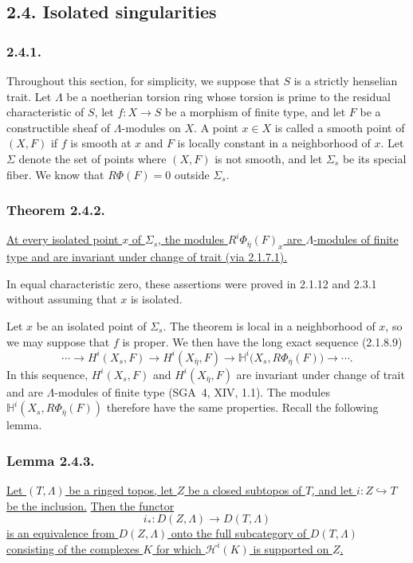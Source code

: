 \subsection*{2.4. Isolated singularities}

\subsubsection*{2.4.1.}
Throughout this section, for simplicity, we suppose that $S$ is a
strictly henselian trait.  Let $\Lambda$ be a noetherian torsion ring
whose torsion is prime to the residual characteristic of $S$, let
$f:X\longrightarrow S$ be a morphism of finite type, and let $F$ be a
constructible sheaf of $\Lambda$-modules on $X$.  A point $x\in X$ is
called a smooth point of $(X,F)$ if $f$ is smooth at $x$ and $F$ is
locally constant in a neighborhood of $x$.  Let $\Sigma$ denote the
set of points where $(X,F)$ is not smooth, and let $\Sigma_s$ be its
special fiber.  We know that $R\Phi(F)=0$ outside $\Sigma_s$.

\subsubsection*{Theorem 2.4.2.}
\underline{At every isolated point $x$ of $\Sigma_s$, the modules
$R^i\Phi_{\bar\eta}(F)_x$ are $\Lambda$-modules of finite type and
are invariant under change of trait (via 2.1.7.1).}

In equal characteristic zero, these assertions were proved in
2.1.12 and 2.3.1 without assuming that $x$ is isolated.

Let $x$ be an isolated point of $\Sigma_s$.  The theorem is local in
a neighborhood of $x$, so we may suppose that $f$ is proper.  We then
have the long exact sequence (2.1.8.9)
\[
\cdots\longrightarrow H^i(X_s,F)
\longrightarrow H^i(X_{\bar\eta},F)
\longrightarrow
\mathbb H^i\bigl(X_s,R\Phi_{\bar\eta}(F)\bigr)
\longrightarrow\cdots .
\]
In this sequence, $H^i(X_s,F)$ and $H^i(X_{\bar\eta},F)$ are
invariant under change of trait and are $\Lambda$-modules of finite
type (SGA~4, XIV, 1.1).  The modules
$\mathbb H^i(X_s,R\Phi_{\bar\eta}(F))$ therefore have the same
properties.  Recall the following lemma.

\subsubsection*{Lemma 2.4.3.}
\underline{Let $(T,\Lambda)$ be a ringed topos, let $Z$ be a closed
subtopos of $T$, and let $i:Z\hookrightarrow T$ be the inclusion.}
\underline{Then the functor}
\[
i_*:D(Z,\Lambda)\longrightarrow D(T,\Lambda)
\]
\underline{is an equivalence from $D(Z,\Lambda)$ onto the full
subcategory of $D(T,\Lambda)$ consisting of the complexes $K$ for
which $\mathcal H^i(K)$ is supported on $Z$.}

